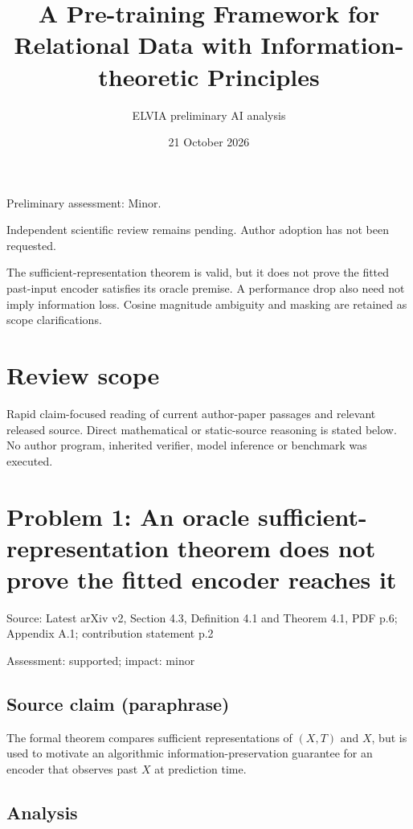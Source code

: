 \documentclass[11pt]{article}
\begin{document}
\title{A Pre-training Framework for Relational Data with Information-theoretic Principles}

\author{ELVIA preliminary AI analysis}\date{21 October 2026}\maketitle

Preliminary assessment: Minor.\par

Independent scientific review remains pending. Author adoption has not been requested.

The sufficient-representation theorem is valid, but it does not prove the fitted past-input encoder satisfies its oracle premise. A performance drop also need not imply information loss. Cosine magnitude ambiguity and masking are retained as scope clarifications.

\section*{Review scope}

Rapid claim-focused reading of current author-paper passages and relevant released source. Direct mathematical or static-source reasoning is stated below. No author program, inherited verifier, model inference or benchmark was executed.

\section*{Problem 1: An oracle sufficient-representation theorem does not prove the fitted encoder reaches it}

Source: Latest arXiv v2, Section 4.3, Definition 4.1 and Theorem 4.1, PDF p.6; Appendix A.1; contribution statement p.2

Assessment: supported; impact: minor

\subsection*{Source claim (paraphrase)}

The formal theorem compares sufficient representations of \((X,T)\) and \(X\), but is used to motivate an algorithmic information-preservation guarantee for an encoder that observes past \(X\) at prediction time.

\subsection*{Analysis}
\end{document}
